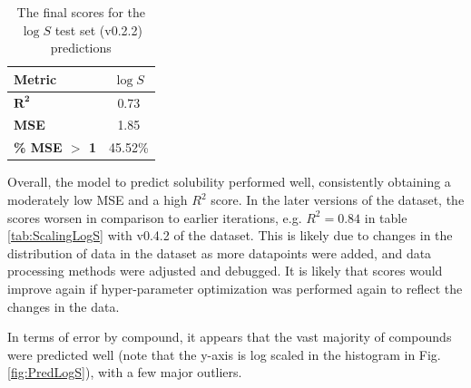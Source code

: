 \documentclass[11pt, titlepage]{article}
\begin{document}
\begin{table}[H]
	\centering
	\small
	\begin{tabular}{|l|c|}
		\hline
		\textbf{Metric} & $\log S$\\
		\hline
		$\mathbf{R^2}$ & 0.73 \\
		\textbf{MSE} & 1.85 \\
		\textbf{\% MSE $>$ 1} & 45.52\% \\
		\hline
	\end{tabular}
	\caption{The final scores for the {$\log S$} test set (v0.2.2) predictions}
	\label{tab:logS_Scores}
\end{table}
Overall, the model to predict solubility performed well, consistently obtaining a moderately low MSE and a high $R^2$ score. In the later versions of the dataset, the scores worsen in comparison to earlier iterations, e.g. $R^2 = 0.84$ in table \ref{tab:ScalingLogS} with v0.4.2 of the dataset. This is likely due to changes in the distribution of data in the dataset as more datapoints were added, and data processing methods were adjusted and debugged. It is likely that scores would improve again if hyper-parameter optimization was performed again to reflect the changes in the data. 

In terms of error by compound, it appears that the vast majority of compounds were predicted well (note that the y-axis is log scaled in the histogram in Fig. \ref{fig:PredLogS}), with a few major outliers. 
\end{document}
